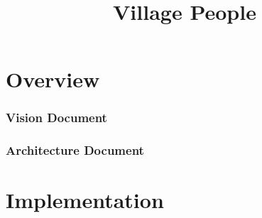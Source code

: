 \documentclass[a4paper,10pt]{book}
\title{Village People}
\begin{document}
\maketitle
\part{Overview}
	\section{Vision Document}
    		
	\section{Architecture Document}
		
\part{Implementation}
\end{document}
